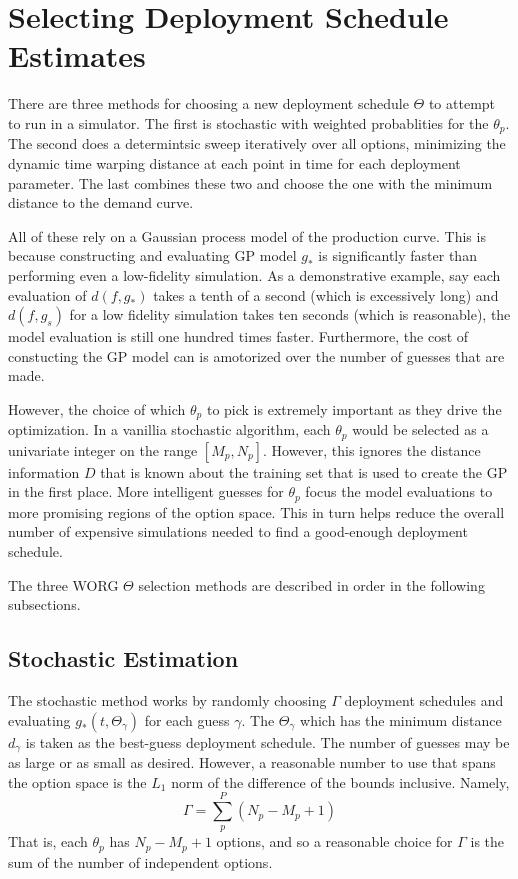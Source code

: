 \section{Selecting Deployment Schedule Estimates}
\label{selecting}

There are three methods for choosing a new deployment schedule $\Theta$ 
to attempt to run in a simulator. The first is stochastic with weighted
probablities for the $\theta_p$.  The second does a determintsic sweep 
iteratively over all options, minimizing the dynamic time warping distance
at each point in time for each deployment parameter.  The last combines
these two and choose the one with the minimum distance to the demand curve.

All of these rely on a Gaussian process model of the production
curve. This is because constructing and evaluating GP model $g_*$ is 
significantly faster than performing even a low-fidelity simulation. 
As a demonstrative example, say each evaluation of $d(f, g_*)$ takes a tenth
of a second (which is excessively long) and $d(f, g_s)$ for a low fidelity
simulation takes ten seconds (which is reasonable), the model evaluation 
is still one hundred times faster.  Furthermore, the cost of constucting 
the GP model can is amotorized over the number of guesses that are made.

However, the choice of which $\theta_p$ to pick is extremely important
as they drive the optimization. In a vanillia stochastic algorithm, 
each $\theta_p$ would be selected as a univariate integer on the 
range $[M_p, N_p]$.  However, this ignores the distance information $D$ 
that is known about the training set that is used to create the GP in the
first place. More intelligent guesses for $\theta_p$ focus the model 
evaluations to more promising regions of the option space.  This in turn 
helps reduce the overall number of expensive simulations needed to find 
a good-enough deployment schedule.

The three WORG $\Theta$ selection methods are described in order in the 
following subsections.

\subsection{Stochastic Estimation}
\label{stochastic}

The stochastic method works by randomly choosing $\Gamma$ deployment 
schedules and evaluating $g_*(t, \Theta_\gamma)$ for each guess $\gamma$.
The $\Theta_\gamma$ which has the minimum distance $d_\gamma$ is 
taken as the best-guess deployment schedule.  The number of guesses may 
be as large or as small as desired.  However, a reasonable number to use
that spans the option space is the $L_1$ norm of the difference of the 
bounds inclusive. Namely, 
\begin{equation}
\label{Gamma-default}
\Gamma = \sum_p^P (N_p - M_p + 1)
\end{equation}
That is, each $\theta_p$ has $N_p - M_p + 1$ options, and so a reasonable
choice for $\Gamma$ is the sum of the number of independent options.

